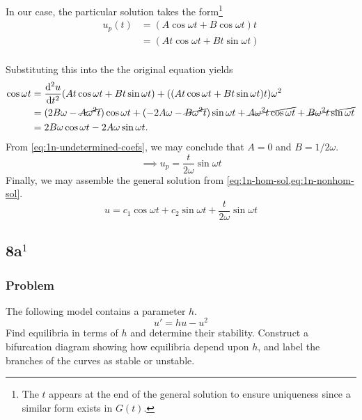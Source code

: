 \documentclass[12pt,twoside]{article}
\begin{document}
\begin{enumerate}
  In our case, the particular solution takes the form\footnote{The $t$ appears
    at the end of the general solution to ensure uniqueness since a similar form
    exists in $G(t)$.}
  \begin{equation*}
    \begin{aligned}
      u_p(t) &= (A\cos \omega t + B\cos \omega t)t \\
      &= (At\cos \omega t + Bt\sin \omega t) \\
    \end{aligned}
  \end{equation*}

  Substituting this into the the original equation yields
  \begin{equation}
    \label{eq:1n-undetermined-coefs}
    \begin{aligned}
      \cos \omega t &=
      \od[2]{u}{t}(At\cos \omega t + Bt\sin \omega t)
      + ((At\cos \omega t + Bt\sin \omega t)t)\omega^2 \\
      &= (2B\omega - \cancel{A\omega^2t})\cos\omega t
      + (-2A\omega - \cancel{B\omega^2t})\sin\omega t
      + \cancel{A\omega^2t\cos\omega t} + \cancel{B\omega^2t\sin\omega t} \\
      &= 2B\omega\cos\omega t - 2A\omega\sin\omega t.
    \end{aligned}
  \end{equation}
  From \cref{eq:1n-undetermined-coefs}, we may conclude that $A=0$ and
  $B=1/2\omega$.
  \begin{equation}
    \label{eq:1n-nonhom-sol}
    \implies u_p = \frac{t}{2\omega}\sin\omega t
  \end{equation}
  Finally, we may assemble the general solution from
  \cref{eq:1n-hom-sol,eq:1n-nonhom-sol}.
  \begin{equation*}
    \boxed{
      u = c_1\cos \omega t + c_2\sin \omega t + \frac{t}{2\omega}\sin\omega t
    }
  \end{equation*}
\end{enumerate}

\subsection{8a$^1$}
\subsubsection*{Problem}
The following model contains a parameter $h$.
\begin{equation*}
  \label{eq:8a-problem}
  u'=hu-u^2
\end{equation*}
Find equilibria in terms of $h$ and determine their stability. Construct a
bifurcation diagram showing how equilibria depend upon $h$, and label the
branches of the curves as stable or unstable.
\end{document}
